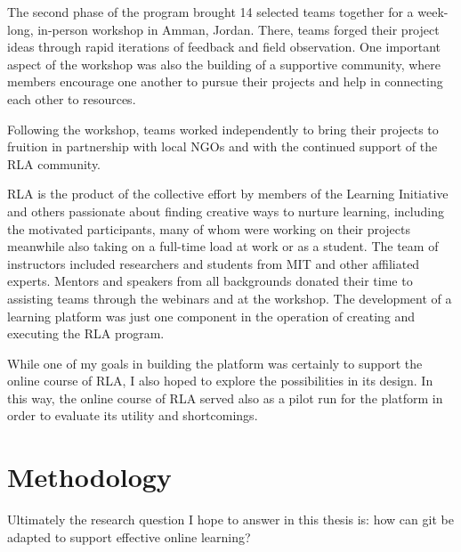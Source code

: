 \documentclass[12pt,twoside,vi]{mitthesis}
\begin{document}
The second phase of the program brought 14 selected teams together for a week-long, in-person workshop in Amman, Jordan. There, teams forged their project ideas through rapid iterations of feedback and field observation. One important aspect of the workshop was also the building of a supportive community, where members encourage one another to pursue their projects and help in connecting each other to resources.

Following the workshop, teams worked independently to bring their projects to fruition in partnership with local NGOs and with the continued support of the RLA community.~\cite{rla}

RLA is the product of the collective effort by members of the Learning Initiative and others passionate about finding creative ways to nurture learning, including the motivated participants, many of whom were working on their projects meanwhile also taking on a full-time load at work or as a student. The team of instructors included researchers and students from MIT and other affiliated experts. Mentors and speakers from all backgrounds donated their time to assisting teams through the webinars and at the workshop. The development of a learning platform was just one component in the operation of creating and executing the RLA program. 

While one of my goals in building the platform was certainly to support the online course of RLA, I also hoped to explore the possibilities in its design. In this way, the online course of RLA served also as a pilot run for the platform in order to evaluate its utility and shortcomings. 

\section{Methodology}

Ultimately the research question I hope to answer in this thesis is: how can git be adapted to support effective online learning?
\end{document}
